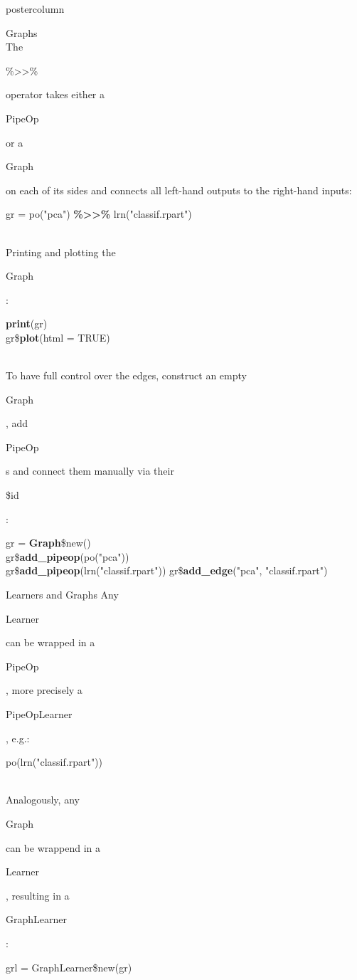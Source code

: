 \documentclass{beamer}
\newcommand{\codeinline}[1]{\begin{codeboxinline}#1\end{codeboxinline}}
\begin{document}
\begin{frame}[fragile]{}
\begin{columns}
\begin{column}{.245\textwidth}
\begin{beamercolorbox}[center]{postercolumn}
\begin{minipage}{.98\textwidth}
{\begin{myblock}{Graphs}
              \ \\
              The \codeinline{\%>>\%} operator takes either a \codeinline{PipeOp} or a \codeinline{Graph} on each of its sides and connects all left-hand outputs to the right-hand inputs:
              \begin{codebox}
                gr = po("pca") \textbf{\%>>\%} lrn("classif.rpart")
              \end{codebox}
              \ \\
              Printing and plotting the \codeinline{Graph}:
              \begin{codeboxmultiline}[width=13cm]
                \textbf{print}(gr)\\
                gr\$\textbf{plot}(html = TRUE)
              \end{codeboxmultiline}
              \ \\
              To have full control over the edges, construct an empty \codeinline{Graph}, add \codeinline{PipeOp}s and connect them manually via their \codeinline{\$id}:
              \begin{codeboxmultiline}[width=20cm]
                gr = \textbf{Graph}\$new()\\
                gr\$\textbf{add\_pipeop}(po("pca"))\\
                gr\$\textbf{add\_pipeop}(lrn("classif.rpart"))
                gr\$\textbf{add\_edge}("pca", "classif.rpart")
              \end{codeboxmultiline}
						\end{myblock}
            \begin{myblock}{Learners and Graphs}
              Any \codeinline{Learner} can be wrapped in a \codeinline{PipeOp}, more precisely a \codeinline{PipeOpLearner}, e.g.:
              \begin{codebox}
                po(lrn("classif.rpart"))
              \end{codebox}
              \ \\
              Analogously, any \codeinline{Graph} can be wrappend in a \codeinline{Learner}, resulting in a \codeinline{GraphLearner}:
              \begin{codebox}
                grl = GraphLearner\$new(gr)
              \end{codebox}

\end{myblock}}
\end{minipage}
\end{beamercolorbox}
\end{column}
\end{columns}
\end{frame}
\end{document}
